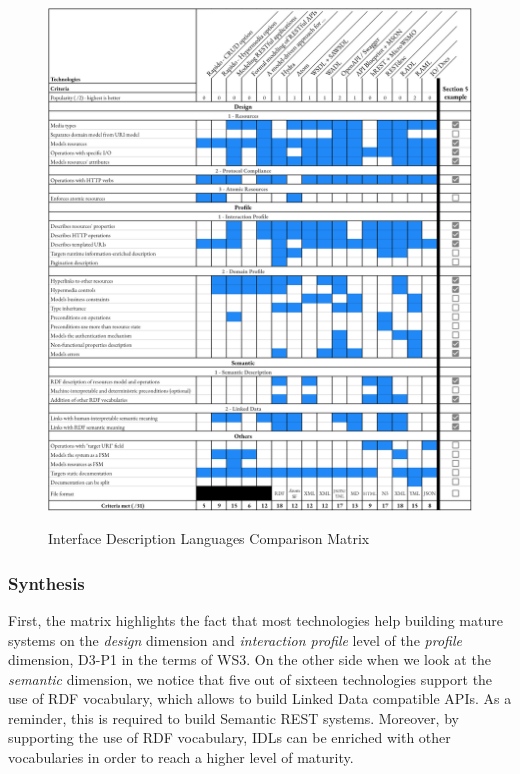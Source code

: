 \begin{figure}[!htbp]
\caption{Interface Description Languages Comparison Matrix}
\includegraphics[width=1\textwidth]{figures/IDL.png}
\label{idl-matrix}
\end{figure}

\subsubsection*{Synthesis}


First, the matrix highlights the fact that most technologies help building mature systems on the \textit{design} dimension and \textit{interaction profile} level of the \textit{profile} dimension, D3-P1 in the terms of WS3.
On the other side when we look at the \textit{semantic} dimension, we notice that five out of sixteen technologies support the use of RDF vocabulary, which allows to build Linked Data compatible APIs. As a reminder, this is required to build Semantic REST systems.
Moreover, by supporting the use of RDF vocabulary, IDLs can be enriched with other vocabularies in order to reach a higher level of maturity.

